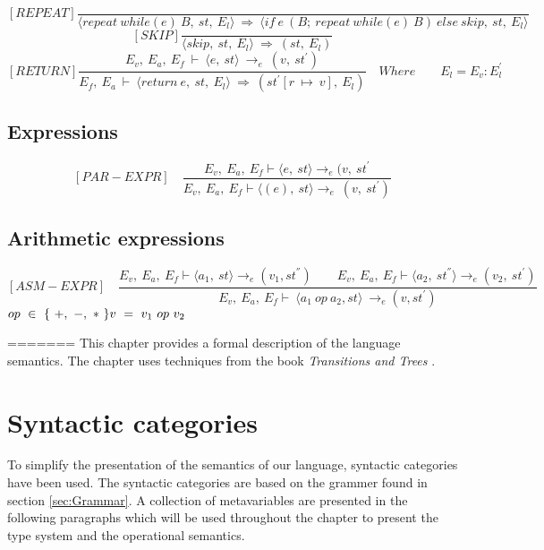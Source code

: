 	\[
	[REPEAT]
	\dfrac{}{\langle repeat \ while(e) \ B, \ st, \ E_l \rangle \ \Rightarrow \ \langle if \ e \ (B; \ repeat \ while(e) \ B) \ else \ skip, \ st, \ E_l \rangle}
	\]\newline
	\[
	[SKIP]
	\dfrac{}{\langle skip, \ st, \ E_l \rangle \ \Rightarrow \ (st, \ E_l)}
	\]\newline
	\[
	[RETURN]	
	\dfrac{E_v, \ E_a, \ E_f \ \vdash \ \langle e, \ st \rangle \ \rightarrow_e \ (v, \ st^{'})}{E_f, \ E_a \ \vdash \ \langle return \ e, \ st, \ E_l \rangle \ \Rightarrow \ (st^{'}[r \ \mapsto \ v], \ E_l)}
	\quad Where	
	\qquad E_l = E_v : E_l^{'}	
	\]\newline

	
\subsection{Expressions}
	\[	
	[PAR-EXPR] \quad	
	\dfrac{E_v, \ E_a, \ E_f \vdash \langle e, \ st \rangle \rightarrow_e (v, \ st^{'}}{E_v, \ E_a, \ E_f \vdash \langle (e), \ st \rangle \rightarrow_e \ (v, \ st^{'})}	
	\]

\subsection{Arithmetic expressions}
	\[
	[ASM-EXPR] \quad	
	\dfrac{E_v, \ E_a, \ E_f \vdash \langle a_1, \ st \rangle \rightarrow_{e} (v_1, st^{''}) \qquad E_v, \ E_a, \ E_f \vdash \langle a_2, \ st^{''}\rangle \rightarrow_e (v_2, \ st^{'})}{E_v, \ E_a, \ E_f \vdash \ \langle a_1 \ op \ a_2, st \rangle \ \rightarrow_{e} (v, st^{'})}	
	\]
	\begin{math}		
		op \ \in \ \{ \ +, \ -, \ * \ \} \newline		
		v \ = \ v_1 \ op \ v_2		
	\end{math}

=======
This chapter provides a formal description of the language semantics. The chapter uses techniques from the book \textit{Transitions and Trees} \cite{Huttel}.
 \section{Syntactic categories}
 To simplify the presentation of the semantics of our language, syntactic categories have been used. The syntactic categories are based on the grammer found in section \ref{sec:Grammar}. A collection of metavariables are presented in the following paragraphs which will be used throughout the chapter to present the type system and the operational semantics.
 
